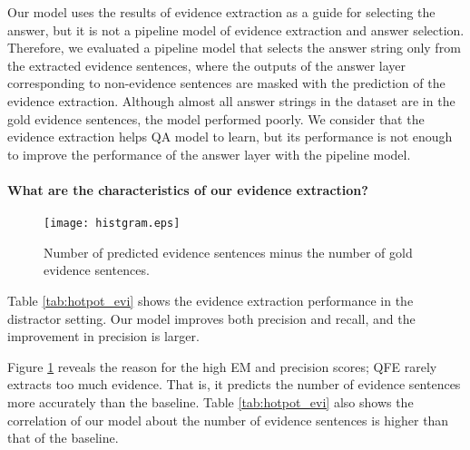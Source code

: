 \documentclass[11pt,a4paper]{article}
\theoremstyle{definition}
\begin{document}
	Our model uses the results of evidence extraction as a guide for selecting the answer, but it is not a pipeline model of evidence extraction and answer selection. Therefore, we evaluated a pipeline model that selects the answer string  only from the extracted evidence sentences, where the outputs of the answer layer corresponding to non-evidence sentences are masked with the prediction of the evidence extraction.
	Although almost all answer strings in the dataset are in the gold evidence sentences,
	the model performed poorly.
    We consider that the evidence extraction helps QA model to learn, but its performance is not enough to improve the performance of the answer layer with the pipeline model.


	\paragraph{What are the characteristics of our evidence extraction?}
	\begin{table}[t]
    \begin{center}
\caption{Performance of our model and the baseline in evidence extraction on the development set in the distractor setting. The correlation is the Kendall tau correlation of the number of predicted evidence sentences and that of gold evidence.} \label{tab:hotpot_evi}
	\end{center}
	\end{table}
	\begin{figure}[t]
	\begin{center}
		\texttt{[image: histgram.eps]}\caption{Number of predicted evidence sentences minus the number of gold evidence sentences.}
		\label{fig:hist_dist}
\end{center}
	\end{figure}

	Table \ref{tab:hotpot_evi} shows the evidence extraction performance in the distractor setting. Our model improves both precision and recall, and the improvement in precision is larger.
	
	Figure \ref{fig:hist_dist} reveals the reason for the high EM and precision scores; QFE rarely extracts too much evidence. That is, it predicts the number of evidence sentences  more accurately than the baseline. Table \ref{tab:hotpot_evi} also shows the correlation of our model about the number of evidence sentences is higher than that of the baseline.
	
\end{document}
